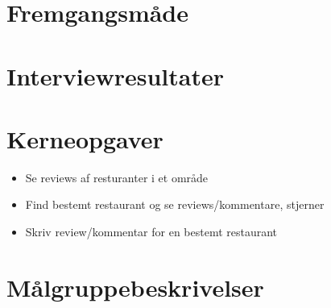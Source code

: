 \documentclass[a4paper, 12pt]{article}
\begin{document}

\newpage
\setcounter{page}{1}
\fancyfoot[C]{\thepage}

\section{Fremgangsmåde}
\label{sec:Fremgangsmaade}

\section{Interviewresultater}
\label{sec:Interviewresultater}

\section{Kerneopgaver}
\label{sec:Kerneopgaver}
\begin{itemize}
\item Se reviews af resturanter i et område
\item Find bestemt restaurant og se reviews/kommentare, stjerner
\item Skriv review/kommentar for en bestemt restaurant
\end{itemize}

\section{Målgruppebeskrivelser}
\label{sec:Maalgruppebeskrivelser}
\end{document}
